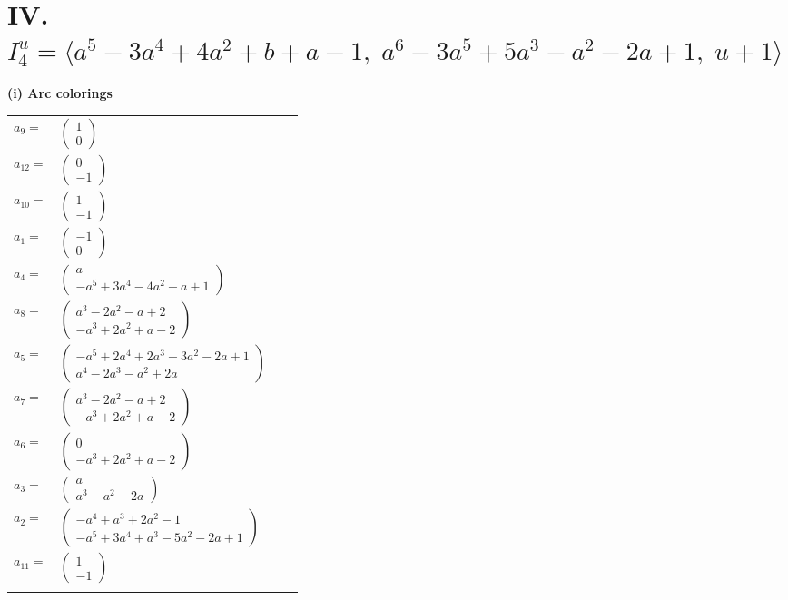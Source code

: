 \documentclass[1p]{elsarticle_modified}
\theoremstyle{definition}
\begin{document}
\centering \section*{IV. $I^u_{4}= \langle a^5-3 a^4+4 a^2+b+a-1,\;a^6-3 a^5+5 a^3- a^2-2 a+1,\;u+1 \rangle$}
\flushleft \textbf{(i) Arc colorings}\\
\begin{tabular}{m{7pt} m{180pt} m{7pt} m{180pt} }
\flushright $a_{9}=$&$\begin{pmatrix}1\\0\end{pmatrix}$ \\
\flushright $a_{12}=$&$\begin{pmatrix}0\\-1\end{pmatrix}$ \\
\flushright $a_{10}=$&$\begin{pmatrix}1\\-1\end{pmatrix}$ \\
\flushright $a_{1}=$&$\begin{pmatrix}-1\\0\end{pmatrix}$ \\
\flushright $a_{4}=$&$\begin{pmatrix}a\\- a^5+3 a^4-4 a^2- a+1\end{pmatrix}$ \\
\flushright $a_{8}=$&$\begin{pmatrix}a^3-2 a^2- a+2\\- a^3+2 a^2+a-2\end{pmatrix}$ \\
\flushright $a_{5}=$&$\begin{pmatrix}- a^5+2 a^4+2 a^3-3 a^2-2 a+1\\a^4-2 a^3- a^2+2 a\end{pmatrix}$ \\
\flushright $a_{7}=$&$\begin{pmatrix}a^3-2 a^2- a+2\\- a^3+2 a^2+a-2\end{pmatrix}$ \\
\flushright $a_{6}=$&$\begin{pmatrix}0\\- a^3+2 a^2+a-2\end{pmatrix}$ \\
\flushright $a_{3}=$&$\begin{pmatrix}a\\a^3- a^2-2 a\end{pmatrix}$ \\
\flushright $a_{2}=$&$\begin{pmatrix}- a^4+a^3+2 a^2-1\\- a^5+3 a^4+a^3-5 a^2-2 a+1\end{pmatrix}$ \\
\flushright $a_{11}=$&$\begin{pmatrix}1\\-1\end{pmatrix}$\\&\end{tabular}
\end{document}
